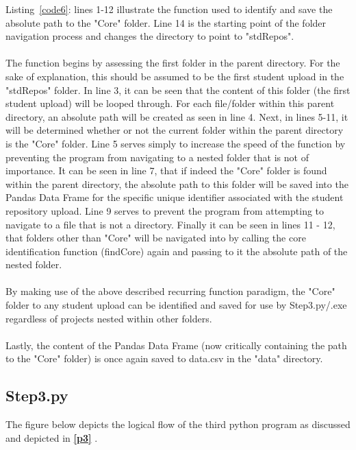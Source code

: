 

Listing~\ref{code6}: lines 1-12 illustrate the function used to identify and save the absolute path to the "Core" folder. Line 14 is the starting point of the folder navigation process and changes the directory to point to "stdRepos".
\\\\
The function begins by assessing the first folder in the parent directory. For the sake of explanation, this should be assumed to be the first student upload in the "stdRepos" folder. In line 3, it can be seen that the content of this folder (the first student upload) will be looped through. For each file/folder within this parent directory, an absolute path will be created as seen in line 4. Next, in lines 5-11, it will be determined whether or not the current folder within the parent directory is the "Core" folder. Line 5 serves simply to increase the speed of the function by preventing the program from navigating to a nested folder that is not of importance. It can be seen in line 7, that if indeed the "Core" folder is found within the parent directory, the absolute path to this folder will be saved into the Pandas Data Frame for the specific unique identifier associated with the student repository upload. Line 9 serves to prevent the program from attempting to navigate to a file that is not a directory. Finally it can be seen in lines 11 - 12, that folders other than "Core" will be navigated into by calling the core identification function (findCore) again and passing to it the absolute path of the nested folder.
\\\\
By making use of the above described recurring function paradigm, the "Core" folder to any student upload can be identified and saved for use by Step3.py/.exe regardless of projects nested within other folders.
\\\\
Lastly, the content of the Pandas Data Frame (now critically containing the path to the "Core" folder) is once again saved to data.csv in the "data" directory.

\newpage\cleardoublepage

\subsection{Step3.py}
\label{step3}

The figure below depicts the logical flow of the third python program as discussed and depicted in \textbf{\ref{p3} }. 

